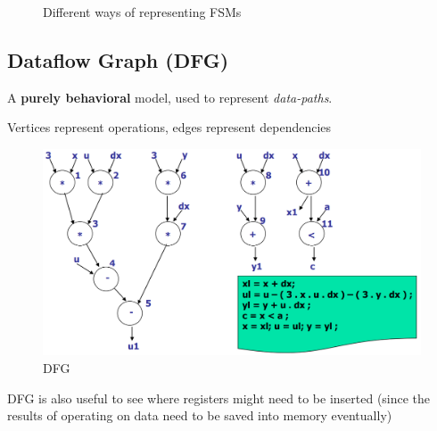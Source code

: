 \documentclass{article}
\begin{document}
\begin{figure}[htp]%
    \centering
    \qquad
    \caption{Different ways of representing FSMs}%
\end{figure}

\newpage
\subsection{Dataflow Graph (DFG)}
A \textbf{purely behavioral} model, used to represent \textit{data-paths}.

Vertices represent operations, edges represent dependencies

\begin{figure}[htp]
    \centering
    \includegraphics[width=15cm, scale=1]{S1/dataFlowGraph.PNG}
    \caption{DFG}
\end{figure}

DFG is also useful to see where registers might need to be inserted (since the results of operating on data need to be saved into memory eventually)
\end{document}
